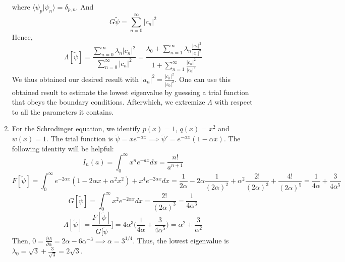 \documentclass[a4paper]{article}
\begin{document}
\begin{ans}
\begin{enumerate}[label=(\roman*)]
where $\langle\psi_p|\psi_n\rangle=\delta_{p,n}$. And
$$G{\tilde{\psi}}=\sum_{n=0}^\infty|c_n|^2$$
Hence,
$$\Lambda[\tilde{\psi}]=\frac{\sum_{n=0}^\infty\lambda_n|c_n|^2}{\sum_{n=0}^\infty|c_n|^2}=\frac{\lambda_0+\sum_{n=1}^\infty\lambda_n\frac{|c_n|^2}{|c_0|^2}}{1+\sum_{n=1}^\infty\frac{|c_n|^2}{|c_0|^2}}$$
We thus obtained our desired result with $|a_n|^2=\frac{|c_n|^2}{|c_0|^2}$. One can use this obtained result to estimate the lowest eigenvalue by guessing a trial function that obeys the boundary conditions. Afterwhich, we extremize $\Lambda$ with respect to all the parameters it contains.
\item For the Schrodinger equation, we identify $p(x)=1$, $q(x)=x^2$ and $w(x)=1$. The trial function is $\tilde{\psi}=xe^{-\alpha x}\implies\tilde{\psi}'=e^{-\alpha x}(1-\alpha x)$. The following identity will be helpful: $$I_n(a)=\int_0^\infty x^ne^{-ax}dx=\frac{n!}{a^{n+1}}$$
$$F[\tilde{\psi}]=\int_0^\infty e^{-2\alpha x}(1-2\alpha x+\alpha^2x^2)+x^4e^{-2\alpha x}dx=\frac{1}{2\alpha}-2\alpha\frac{1}{(2\alpha)^2}+\alpha^2\frac{2!}{(2\alpha)^3}+\frac{4!}{(2\alpha)^5}=\frac{1}{4\alpha}+\frac{3}{4\alpha^5}$$
$$G[\tilde{\psi}]=\int_0^\infty x^2e^{-2\alpha x}dx=\frac{2!}{(2\alpha)^3}=\frac{1}{4\alpha^3}$$
$$\Lambda[\tilde{\psi}]=\frac{F[\tilde{\psi}]}{G[\tilde{\psi}}]=4\alpha^3\bigg(\frac{1}{4\alpha}+\frac{3}{4\alpha^5}\bigg)=\alpha^2+\frac{3}{\alpha^2}$$
Then, $0=\frac{\partial\Lambda}{\partial\alpha}=2\alpha-6\alpha^{-3}\implies\alpha=3^{1/4}$. Thus, the lowest eigenvalue is $\lambda_0=\sqrt{3}+\frac{3}{\sqrt{3}}=2\sqrt{3}$.
\end{enumerate}
\end{ans}
\newpage
\end{document}
